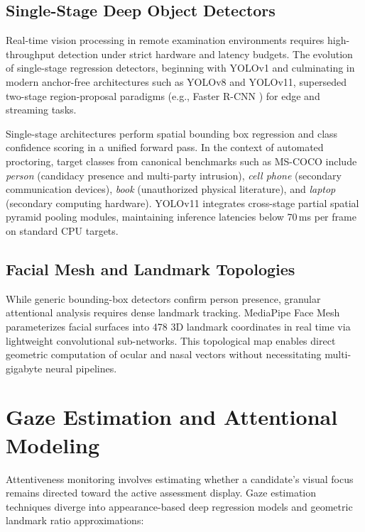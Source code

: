 \subsection{Single-Stage Deep Object Detectors}

Real-time vision processing in remote examination environments requires high-throughput detection under strict hardware and latency budgets. The evolution of single-stage regression detectors, beginning with YOLOv1 \cite{yolo2016} and culminating in modern anchor-free architectures such as YOLOv8 and YOLOv11, superseded two-stage region-proposal paradigms (e.g., Faster R-CNN \cite{ren2015}) for edge and streaming tasks.

Single-stage architectures perform spatial bounding box regression and class confidence scoring in a unified forward pass. In the context of automated proctoring, target classes from canonical benchmarks such as MS-COCO \cite{lin2014} include \textit{person} (candidacy presence and multi-party intrusion), \textit{cell phone} (secondary communication devices), \textit{book} (unauthorized physical literature), and \textit{laptop} (secondary computing hardware). YOLOv11 integrates cross-stage partial spatial pyramid pooling modules, maintaining inference latencies below 70\,ms per frame on standard CPU targets.

\subsection{Facial Mesh and Landmark Topologies}

While generic bounding-box detectors confirm person presence, granular attentional analysis requires dense landmark tracking. MediaPipe Face Mesh \cite{mediapipe2020} parameterizes facial surfaces into 478 3D landmark coordinates in real time via lightweight convolutional sub-networks. This topological map enables direct geometric computation of ocular and nasal vectors without necessitating multi-gigabyte neural pipelines.

\section{Gaze Estimation and Attentional Modeling}

Attentiveness monitoring involves estimating whether a candidate's visual focus remains directed toward the active assessment display. Gaze estimation techniques diverge into appearance-based deep regression models and geometric landmark ratio approximations:

